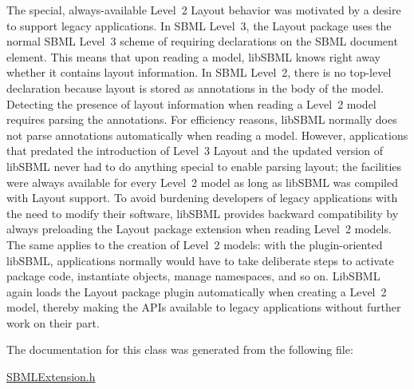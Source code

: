 The special, always-\/available Level~2 Layout behavior was motivated by a desire to support legacy applications. In S\+B\+ML Level~3, the Layout package uses the normal S\+B\+ML Level~3 scheme of requiring declarations on the S\+B\+ML document element. This means that upon reading a model, lib\+S\+B\+ML knows right away whether it contains layout information. In S\+B\+ML Level~2, there is no top-\/level declaration because layout is stored as annotations in the body of the model. Detecting the presence of layout information when reading a Level~2 model requires parsing the annotations. For efficiency reasons, lib\+S\+B\+ML normally does not parse annotations automatically when reading a model. However, applications that predated the introduction of Level~3 Layout and the updated version of lib\+S\+B\+ML never had to do anything special to enable parsing layout; the facilities were always available for every Level~2 model as long as lib\+S\+B\+ML was compiled with Layout support. To avoid burdening developers of legacy applications with the need to modify their software, lib\+S\+B\+ML provides backward compatibility by always preloading the Layout package extension when reading Level~2 models. The same applies to the creation of Level~2 models\+: with the plugin-\/oriented lib\+S\+B\+ML, applications normally would have to take deliberate steps to activate package code, instantiate objects, manage namespaces, and so on. Lib\+S\+B\+ML again loads the Layout package plugin automatically when creating a Level~2 model, thereby making the A\+P\+Is available to legacy applications without further work on their part. 

The documentation for this class was generated from the following file\+:\begin{DoxyCompactItemize}
\item 
\hyperlink{_s_b_m_l_extension_8h}{S\+B\+M\+L\+Extension.\+h}\end{DoxyCompactItemize}
